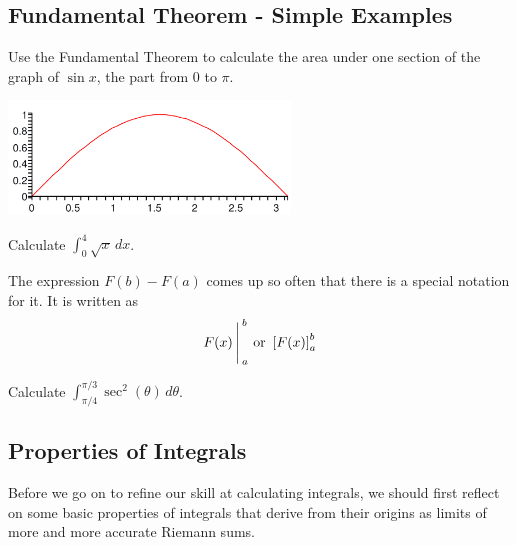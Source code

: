 \newpage
{}
\subsection*{Fundamental Theorem - Simple Examples}

\problem Use the Fundamental Theorem to calculate the area under one
section of the graph of $\sin x$, the part from 0 to $\pi$.
\begin{center}
\includegraphics[width=7.5cm]{graphics/notes_04_sin}
\end{center}

\newpage
\problem
Calculate $\displaystyle \int_0^4 \sqrt{x}\,dx$.

\newpage
{}\medskip

\noindent The expression $F(b)-F(a)$ comes up so often that there is a special
notation for it.  It is written as
$$F(x)\Bigg\arrowvert_a^b \text{ or } \left[ F(x) \right]_a^b$$ 


\begin{problem}
Calculate $\displaystyle \int_{\pi/4}^{\pi/3} \sec^2 (\theta) \, d \theta$.
 
\end{problem}



\newpage
{}
\subsection*{Properties of Integrals}
Before we go on to refine our skill at calculating integrals, we
should first reflect on some basic properties of integrals that
derive from their origins as limits of more and more accurate
Riemann sums.

